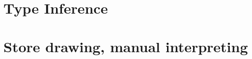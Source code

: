 \documentclass[../codeprint.tex]{subfiles}
\begin{document}
\section{Type Inference}


\section{Store drawing, manual interpreting}

\end{document}
